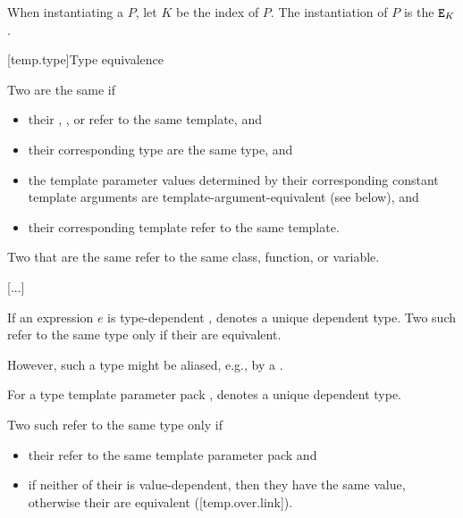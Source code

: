 \documentclass{wg21}
\begin{document}
\begin{addedblock}
When instantiating a  $P$,
let $K$ be the index of $P$.
The instantiation of $P$ is the  $\texttt{E}_K$.
\end{addedblock}

[temp.type]{Type equivalence}

\pnum
{}%
Two  are the same if
\begin{itemize}
\item
their ,
, or
refer to the same template, and

\item
their corresponding type 
are the same type, and

\item
the template parameter values determined by
their corresponding constant template arguments
are template-argument-equivalent (see below), and

\item
their corresponding template 
refer to the same template.
\end{itemize}
Two  that are the same
refer to the same class, function, or variable.

[...]

\pnum
If an expression $e$ is type-dependent ,
denotes a unique dependent type. Two such 
refer to the same type only if their  are
equivalent.
\begin{note}
    However, such a type might be aliased,
    e.g., by a .
\end{note}


\pnum
For a type template parameter pack ,
\tcode{T...[}\tcode{]} denotes
a unique dependent type.

\pnum
Two such  refer to the same type only if
\begin{itemize}
\item their  refer to the same template parameter pack and
\item if neither of their  is value-dependent, then they have the same value, otherwise their  are equivalent ([temp.over.link]).
\end{itemize}
\end{document}

